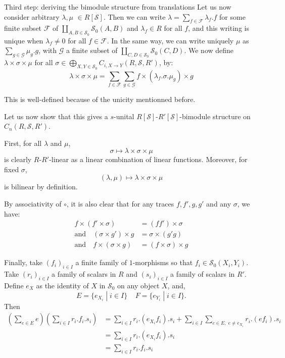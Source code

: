 \documentclass[a4paper,fleqn]{cas-sc}
\newcommand{\cS}{{\mathcal{S}}}
\begin{document}
\begin{paragraph}{Third step: deriving the bimodule structure from translations}
Let us now consider arbitrary $\lambda , \mu$ $ \in R[\cS]$. Then we can write $\lambda = \sum_{ f \in \mathcal{F}} \lambda_f .f$ for some finite 
subset $\mathcal{F}$ of $\coprod\limits_{A,B \in \cS_0} \cS_0(A,B)$
and $\lambda_f \in R$ for all $f$, and this writing is unique when $\lambda_f \neq 0$ for all $f \in \mathcal{F}$. In the same way, we can write uniquely $\mu$ as $\sum_{ g \in \mathcal{G}} \mu_g .g $, with $\mathcal{G}$ a finite subset of $\coprod\limits_{C,D \in \cS_0} \cS_0(C,D)$. We now define $\lambda \times \sigma \times \mu$ for all $\sigma \in \bigoplus_{X,Y \in \cS_0}{C_{i,X\rightarrow Y} \left( R, \cS, R'\right)}$, by:
\[ \lambda \times \sigma \times \mu = \sum_{ f \in \mathcal{F}} \sum_{ g \in \mathcal{G}} f \times \left( \lambda_f. \sigma . \mu_g  \right) \times g \]

This is well-defined because of the unicity mentionned before.

Let us now show that this gives a $s$-unital $R[\cS]$-$R'[\cS]$-bimodule structure on $C_n \left( R, \cS, R'\right)$.

First, for all $\lambda$ and $\mu$, 
\[\sigma \mapsto \lambda \times \sigma \times \mu\]
is clearly $R$-$R'$-linear as a linear combination of linear functions. Moreover, for fixed $\sigma$, 
\[
(\lambda, \mu) \mapsto \lambda \times \sigma \times \mu
\]
is bilinear by definition.

By associativity of $\circ$, it is also clear that for any traces $f, f', g, g'$ and any $\sigma$, we have:
\begin{align*}
    f \times (f' \times \sigma) &= (f f') \times \sigma \\
   \text{and} \quad 
   (\sigma \times g') \times g &= \sigma \times (g'g) \\
   \text{and} \quad
   f \times (\sigma \times g) &= (f \times \sigma) \times g
\end{align*}



Finally, take $(f_i)_{i \in I}$  a finite family of $1$-morphisms so that $f_i \in \cS_0(X_i, Y_i)$. Take $(r_i)_{i \in I} $ a family of scalars in $R$ and $(s_i)_{i \in I}$ a family of scalars in $R'$. 
Define $e_X$ as the identity of $X$ in $\cS_0$ on any object $X$, and,
\[
E = \{e_{X_i} \; | \; i \in I\} \ \ \ \ \ 
F = \{e_{Y_i} \; | \; i \in I\}.
\]
%
Then
\begin{align*}
    \left(\sum_{e \in E} e\right) \left(\sum_{i \in I} r_i. f_i.s_i\right) 
    &= \sum_{i \in I} r_i. (e_{X_i} f_i).s_i + \sum_{i \in I} \sum_{e \in E, \; e \neq e_{X_i}} r_i.(e f_i).s_i\\
    &= \sum_{i \in I} r_i . (e_{X_i} f_i).s_i \\
    &= \sum_{i \in I} r_i.f_i.s_i
\end{align*}


\end{paragraph}
\end{document}

